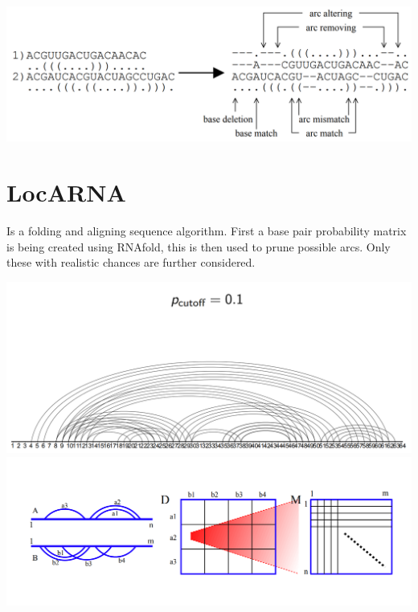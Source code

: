 \documentclass{scrartcl}
\begin{document}
\includegraphics[width=\textwidth]{bioinfII/images/arc_things}



% 
% 
% 
% 


\section*{LocARNA}

Is a folding and aligning sequence algorithm. 
First a base pair probability matrix is being created using RNAfold, this is
then used to prune possible arcs. Only these with realistic chances are further
considered.


\includegraphics[width=\textwidth]{bioinfII/images/cutoff_01}
\includegraphics[width=\textwidth]{bioinfII/images/locarnamatrices2}
\end{document}
